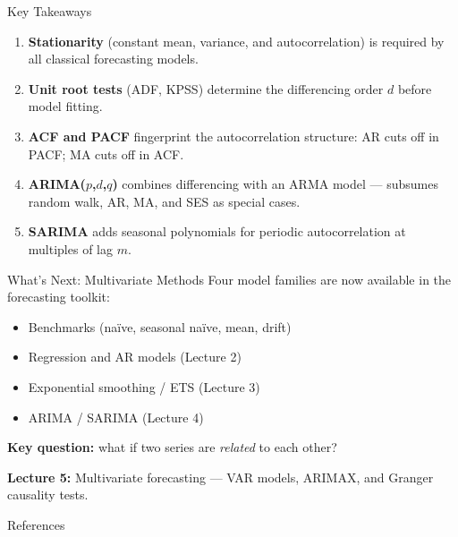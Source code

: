 \documentclass[aspectratio=169, 11pt]{beamer}
\begin{document}
\begin{frame}{Key Takeaways}
  \begin{keybox}
    {\small
    \begin{enumerate}
      \item \textbf{Stationarity} (constant mean, variance, and autocorrelation)
            is required by all classical forecasting models.
      \item \textbf{Unit root tests} (ADF, KPSS) determine the differencing
            order $d$ before model fitting.
      \item \textbf{ACF and PACF} fingerprint the autocorrelation structure:
            AR cuts off in PACF; MA cuts off in ACF.
      \item \textbf{ARIMA($p$,$d$,$q$)} combines differencing with an ARMA
            model --- subsumes random walk, AR, MA, and SES as special cases.
      \item \textbf{SARIMA} adds seasonal polynomials for periodic
            autocorrelation at multiples of lag $m$.
    \end{enumerate}
    }
  \end{keybox}
\end{frame}

\begin{frame}{What's Next: Multivariate Methods}
  Four model families are now available in the forecasting toolkit:
  \begin{itemize}\small
    \item Benchmarks (na\"{i}ve, seasonal na\"{i}ve, mean, drift)
    \item Regression and AR models (Lecture 2)
    \item Exponential smoothing / ETS (Lecture 3)
    \item ARIMA / SARIMA (Lecture 4)
  \end{itemize}
  \vspace{0.1cm}
  \textbf{Key question:} what if two series are \emph{related} to each other?
  \begin{keybox}
    \textbf{Lecture 5:} Multivariate forecasting --- VAR models,
    ARIMAX, and Granger causality tests.
  \end{keybox}
  \begin{center}
  \end{center}
\end{frame}

\begin{frame}[allowframebreaks]{References}
  \printbibliography[heading=none]
\end{frame}
\end{document}

